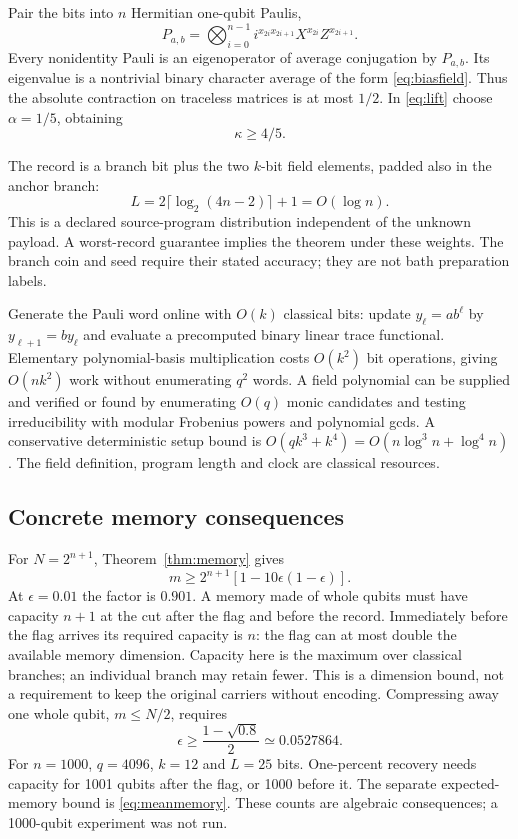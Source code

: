 \documentclass[11pt]{article}
\begin{document}
Pair the bits into $n$ Hermitian one-qubit Paulis,
\begin{equation}
 P_{a,b}=\bigotimes_{i=0}^{n-1}
 i^{x_{2i}x_{2i+1}}X^{x_{2i}}Z^{x_{2i+1}}.
\end{equation}
Every nonidentity Pauli is an eigenoperator of average conjugation by
$P_{a,b}$. Its eigenvalue is a nontrivial binary character average of the form
\eqref{eq:biasfield}. Thus the absolute contraction on traceless matrices is
at most $1/2$. In \eqref{eq:lift} choose $\alpha=1/5$, obtaining
\begin{equation}
 \boxed{\kappa\ge4/5.} \label{eq:goodgap}
\end{equation}

The record is a branch bit plus the two $k$-bit field elements, padded also
in the anchor branch:
\begin{equation}
 L=2\lceil\log_2(4n-2)\rceil+1=O(\log n). \label{eq:record}
\end{equation}
This is a declared source-program distribution independent of the unknown
payload. A worst-record guarantee implies the theorem under these weights.
The branch coin and seed require their stated accuracy; they are not bath
preparation labels.

Generate the Pauli word online with $O(k)$ classical bits: update
$y_\ell=ab^\ell$ by $y_{\ell+1}=by_\ell$ and evaluate a precomputed binary
linear trace functional. Elementary polynomial-basis multiplication costs
$O(k^2)$ bit operations, giving $O(nk^2)$ work without enumerating $q^2$
words. A field polynomial can be supplied and verified or found by enumerating
$O(q)$ monic candidates and testing irreducibility with modular Frobenius
powers and polynomial gcds. A conservative deterministic setup bound is
$O(qk^3+k^4)=O(n\log^3n+\log^4n)$. The field definition, program length
and clock are classical resources.

\subsection{Concrete memory consequences}
For $N=2^{n+1}$, Theorem~\ref{thm:memory} gives
\begin{equation}
 m\ge2^{n+1}[1-10\epsilon(1-\epsilon)]. \label{eq:paulimemory}
\end{equation}
At $\epsilon=0.01$ the factor is $0.901$. A memory made of whole qubits must
have capacity $n+1$ at the cut after the flag and before the record.
Immediately before the flag arrives its required capacity is $n$: the flag can
at most double the available memory dimension. Capacity here is the maximum
over classical branches; an individual branch may retain fewer. This is a
dimension bound, not a requirement to keep the original carriers without encoding.
Compressing away one whole qubit, $m\le N/2$, requires
\begin{equation}
 \epsilon\ge\frac{1-\sqrt{0.8}}2\simeq0.0527864.
\end{equation}
For $n=1000$, $q=4096$, $k=12$ and $L=25$ bits. One-percent recovery needs
capacity for 1001 qubits after the flag, or 1000 before it. The separate
expected-memory bound is \eqref{eq:meanmemory}. These counts are algebraic
consequences; a 1000-qubit experiment was not run.
\end{document}
